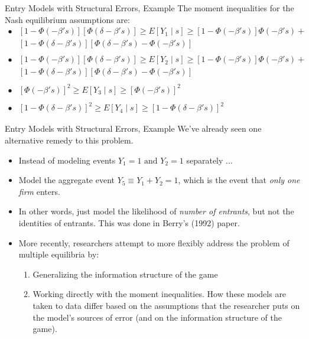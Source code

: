 \documentclass[aspectratio=169,11pt]{beamer}
\begin{document}
\begin{frame}{Entry Models with Structural Errors, Example}
The moment inequalities for the Nash equilibrium assumptions are:
\begin{equation*}
\begin{split}
\bullet & [1- \Phi(-\beta 's)][\Phi(\delta - \beta 's)] \geq E[Y_1 \mid s] \geq [1 -\Phi(-\beta 's)] \Phi(-\beta 's) + \\ 
& [1 - \Phi(\delta - \beta 's)][\Phi(\delta - \beta 's) - \Phi(-\beta 's)] \\ \\
\bullet & [1- \Phi(-\beta 's)][\Phi(\delta - \beta 's)] \geq E[Y_2 \mid s] \geq [1 -\Phi(-\beta 's)] \Phi(-\beta 's) + \\ 
& [1 - \Phi(\delta - \beta 's)][\Phi(\delta - \beta 's) - \Phi(-\beta 's)] \\ \\
\bullet & [\Phi(-\beta 's)]^2 \geq E[Y_3 \mid s] \geq [\Phi (-\beta 's)]^2 \\ \\
\bullet & [1 - \Phi (\delta - \beta 's)]^2 \geq E[Y_4 \mid s] \geq [1 - \Phi (\delta - \beta 's)]^2
\end{split}
\end{equation*}
\end{frame}
\begin{frame}{Entry Models with Structural Errors, Example}
We've already seen one alternative remedy to this problem. 
\begin{itemize}
\item Instead of modeling events $Y_1 = 1 \text{ and } Y_2 = 1$ separately ...
\item Model the aggregate event $Y_5 \equiv Y_1 + Y_2 = 1$, which is the event that \emph{only one firm} enters.
\item In other words, just model the likelihood of \emph{number of entrants}, but not the identities of entrants. This was done in Berry's (1992) paper. 
\item More recently, researchers attempt to more flexibly address the problem of multiple equilibria by:
\begin{enumerate} 
\item Generalizing the information structure of the game
\item Working directly with the moment inequalities.  How these models are taken to data differ based on the assumptions that the researcher puts on the model's sources of error (and on the information structure of the game).
\end{enumerate}
\end{itemize}
\end{frame}
\end{document}
